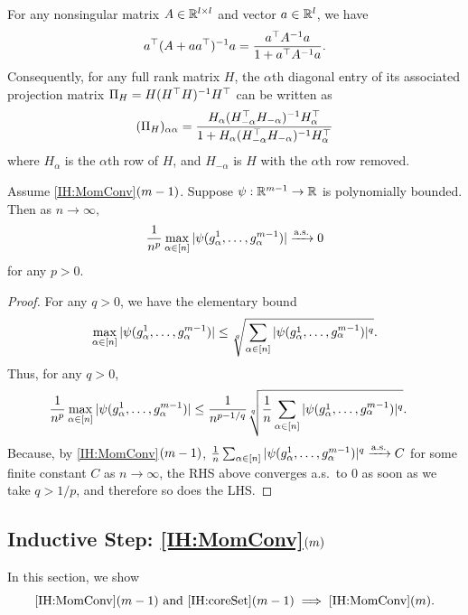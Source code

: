 \documentclass[main.tex]{subfiles}
\begin{document}
\begin{fact}\label{fact:ShermanMorrison}
For any nonsingular matrix $A \in \mathbb{R}^{l \times l}$ and vector $a \in \mathbb{R}^l$,
we have
\[a^\top (A + aa^\top)^{-1} a = \frac{a^\top A^{-1} a}{1 + a^\top {A}^{-1} a}.
\]
Consequently, for any full rank matrix $H$, the $\alpha$th diagonal entry of its associated projection matrix $\Pi_H = H (H^\top H)^{-1} H^\top$ can be written as
\[(\Pi_H)_{\alpha\alpha} = \frac{H_\alpha (H_{-\alpha}^\top H_{-\alpha})^{-1} H_\alpha^\top}{1 + H_\alpha (H_{-\alpha}^\top H_{-\alpha})^{-1} H_\alpha^\top}
\]
where $H_\alpha$ is the $\alpha$th row of $H$, and $H_{-\alpha}$ is $H$ with the $\alpha$th row removed.
\end{fact}

\begin{lemma}\label{lemma:maxbound}
Assume \ref{IH:MomConv}$(m-1)$.
Suppose $\psi: \mathbb{R}^{m-1} \to \mathbb{R}$ is polynomially bounded.
Then as $n \to \infty,$
\[\frac{1}{n^p} \max_{\alpha \in [n]} |\psi(g^1_\alpha, \ldots, g^{m-1}_\alpha)| \xrightarrow{\mathrm{a.s.}} 0\]
for any $p > 0$.
\end{lemma}
\begin{proof}
For any $q > 0$, we have the elementary bound
\begin{equation*}
\max_{\alpha \in [n]} |\psi(g^1_\alpha, \ldots, g^{m-1}_\alpha)|
\le
\sqrt[q]{\sum_{\alpha \in [n]}
|\psi(g^1_\alpha, \ldots, g^{m-1}_\alpha)|^q}.
\end{equation*}
Thus, for any $q > 0$,
\begin{align*}
\frac{1}{n^p} \max_{\alpha \in [n]} |\psi(g^1_\alpha, \ldots, g^{m-1}_\alpha)|
&\le
    \frac{1}{n^{p-1/q}} 
    \sqrt[q]{\frac{1}{n}
        \sum_{\alpha \in [n]}
        |\psi(g^1_\alpha, \ldots, g^{m-1}_\alpha)|^q}.
\end{align*}
Because, by \ref{IH:MomConv}$(m-1)$, $\frac{1}{n}
        \sum_{\alpha \in [n]}
        |\psi(g^1_\alpha, \ldots, g^{m-1}_\alpha)|^q \xrightarrow{\mathrm{a.s.}} C$ for some finite constant $C$ as $n \to \infty$,
the RHS above converges a.s.\ to 0 as soon as we take $q > 1/p$, and therefore so does the LHS.

\end{proof}

\subsection{Inductive Step: \ref{IH:MomConv}\texorpdfstring{$(m)$}{(m)}}
\label{sec:inductiveMoments}
In this section, we show
\begin{equation*}
\text{\ref{IH:MomConv}$(m-1)$ and \ref{IH:coreSet}$(m-1)$} \implies \text{\ref{IH:MomConv}}(m).
\end{equation*}
\end{document}
